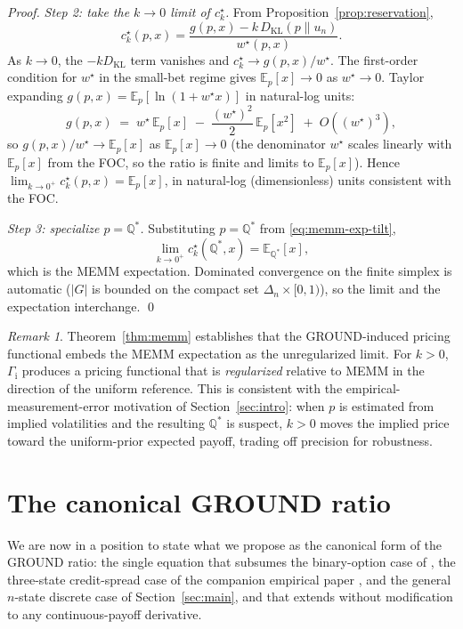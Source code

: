 \documentclass[11pt]{article}
\theoremstyle{definition}
\theoremstyle{remark}
\newtheorem{remark}[theorem]{Remark}
\newcommand{\E}{\mathbb{E}}
\newcommand{\Q}{\mathbb{Q}}
\newcommand{\G}{g}
\newcommand{\KL}{D_{\mathrm{KL}}}
\newcommand{\GROUND}{\Gamma_{\mathrm{i}}}
\begin{document}
\begin{proof}
\emph{Step 2: take the $k \to 0$ limit of $c^\star_k$.} From
Proposition~\ref{prop:reservation},
\begin{equation*}
c^\star_k(p, x) = \frac{\G(p, x) - k \, \KL(p \| u_n)}{w^\star(p, x)}.
\end{equation*}
As $k \to 0$, the $-k \KL$ term vanishes and $c^\star_k \to
\G(p,x)/w^\star$. The first-order condition for $w^\star$ in the small-bet
regime gives $\E_p[x] \to 0$ as $w^\star \to 0$. Taylor expanding
$\G(p,x) = \E_p[\ln(1 + w^\star x)]$ in natural-log units:
\begin{equation*}
\G(p, x) \;=\; w^\star \, \E_p[x] \;-\; \frac{(w^\star)^2}{2} \, \E_p[x^2] \;+\; O((w^\star)^3),
\end{equation*}
so $\G(p, x) / w^\star \to \E_p[x]$ as $\E_p[x] \to 0$ (the
denominator $w^\star$ scales linearly with $\E_p[x]$ from the FOC, so
the ratio is finite and limits to $\E_p[x]$). Hence
$\lim_{k \to 0^+} c^\star_k(p, x) = \E_p[x]$, in natural-log
(dimensionless) units consistent with the FOC.

\emph{Step 3: specialize $p = \Q^*$.} Substituting $p = \Q^*$ from
\eqref{eq:memm-exp-tilt},
\begin{equation*}
\lim_{k \to 0^+} c^\star_k(\Q^*, x) = \E_{\Q^*}[x],
\end{equation*}
which is the MEMM expectation. Dominated convergence on the finite
simplex is automatic ($|G|$ is bounded on the compact set $\Delta_n
\times [0, 1)$), so the limit and the expectation interchange. \qed
\end{proof}

\begin{remark}
Theorem~\ref{thm:memm} establishes that the GROUND-induced pricing
functional embeds the MEMM expectation as the unregularized limit. For
$k > 0$, $\GROUND$ produces a pricing functional that is
\emph{regularized} relative to MEMM in the direction of the uniform
reference. This is consistent with the empirical-measurement-error
motivation of Section~\ref{sec:intro}: when $p$ is estimated from
implied volatilities and the resulting $\Q^*$ is suspect, $k > 0$
moves the implied price toward the uniform-prior expected payoff,
trading off precision for robustness.
\end{remark}
\section{The canonical GROUND ratio}\label{sec:continuous}

We are now in a position to state what we propose as the canonical
form of the GROUND ratio: the single equation that subsumes the
binary-option case of \citet{mercurio2020binary}, the three-state
credit-spread case of the companion empirical paper
\citep{mercurio2026empirical}, and the general $n$-state discrete
case of Section~\ref{sec:main}, and that extends without modification
to any continuous-payoff derivative.
\end{document}
